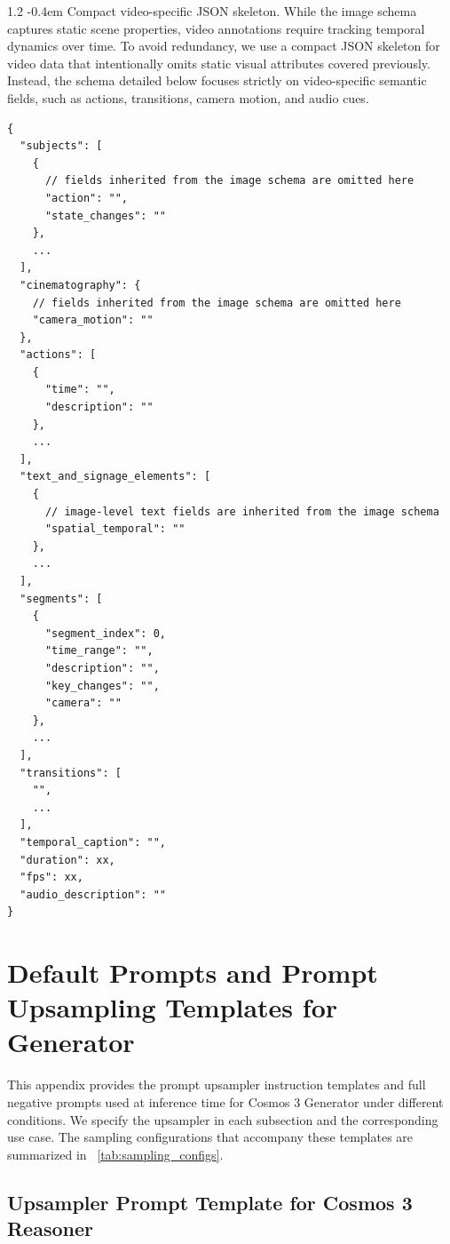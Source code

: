 \documentclass{llmxive}
\makeatletter
\providecommand{\paragraph}{  \@startsection{paragraph}{4}{\z@}    {1\baselineskip \@plus .2\baselineskip}    {-0.4em}    {\normalfont\normalsize\bfseries}}
\makeatother
\begin{document}
\paragraph{Compact video-specific JSON skeleton.}
While the image schema captures static scene properties, video annotations require tracking temporal dynamics over time. To avoid redundancy, we use a compact JSON skeleton for video data that intentionally omits static visual attributes covered previously. Instead, the schema detailed below focuses strictly on video-specific semantic fields, such as actions, transitions, camera motion, and audio cues.
\begin{tcolorbox}[
    breakable,
    colback=black!2,
    colframe=nvidiagreen!75!white,
    boxrule=0.4pt,
    arc=1pt,
    left=4pt,
    right=4pt,
    top=4pt,
    bottom=4pt,
    title=Compact Video-specific JSON Skeleton
]
\begin{Verbatim}[breaklines=true,breakanywhere=true,fontsize=\scriptsize]
{
  "subjects": [
    {
      // fields inherited from the image schema are omitted here
      "action": "",
      "state_changes": ""
    },
    ...
  ],
  "cinematography": {
    // fields inherited from the image schema are omitted here
    "camera_motion": ""
  },
  "actions": [
    {
      "time": "",
      "description": ""
    },
    ...
  ],
  "text_and_signage_elements": [
    {
      // image-level text fields are inherited from the image schema
      "spatial_temporal": ""
    },
    ...
  ],
  "segments": [
    {
      "segment_index": 0,
      "time_range": "",
      "description": "",
      "key_changes": "",
      "camera": ""
    },
    ...
  ],
  "transitions": [
    "",
    ...
  ],
  "temporal_caption": "",
  "duration": xx,
  "fps": xx,
  "audio_description": ""
}
\end{Verbatim}
\end{tcolorbox}
\section{Default Prompts and Prompt Upsampling Templates for Generator}
This appendix provides the prompt upsampler instruction templates and  full negative prompts used at inference time for Cosmos 3 Generator under different conditions. We specify the upsampler in each subsection and the corresponding use case. The sampling configurations that accompany these templates are summarized in ~\cref{tab:sampling_configs}.

\subsection{Upsampler Prompt Template for Cosmos 3 Reasoner}
\label{appendix:upsampler_prompt_template}
\end{document}
